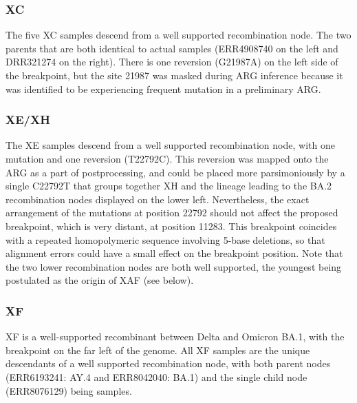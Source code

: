 \documentclass[12pt]{article}
\begin{document}


\subsubsection{XC}
\label{sec:dd_xc}
The five XC samples descend from a well supported recombination node.
The two parents that are both identical to actual samples
(ERR4908740 on the left and DRR321274 on the right).
There is one reversion (G21987A) on the left side of the breakpoint,
but the site 21987 was masked during ARG inference
because it was identified to be experiencing
frequent mutation in a preliminary ARG.

\subsubsection{XE/XH}
\label{sec:dd_xexh}

The XE samples descend from a well supported recombination node,
with one mutation and one reversion (T22792C).
This reversion was mapped onto the ARG
as a part of postprocessing,
and could be placed more parsimoniously by a single C22792T
that groups together XH
and the lineage leading to the BA.2 recombination nodes
displayed on the lower left.
Nevertheless, the exact arrangement of the mutations at position 22792
should not affect the proposed breakpoint,
which is very distant, at position 11283.
This breakpoint coincides with a repeated homopolymeric sequence
involving 5-base deletions,
so that alignment errors could have a small effect
on the breakpoint position.
Note that the two lower recombination nodes are both well supported,
the youngest being postulated as the origin of XAF (see below).


\subsubsection{XF}
\label{sec:dd_xf}
XF is a well-supported recombinant between Delta and Omicron BA.1,
with the breakpoint on the far left of the genome.
All XF samples are the unique descendants of
a well supported recombination node,
with both parent nodes (ERR6193241: AY.4 and ERR8042040: BA.1) and
the single child node (ERR8076129) being samples.
\end{document}
